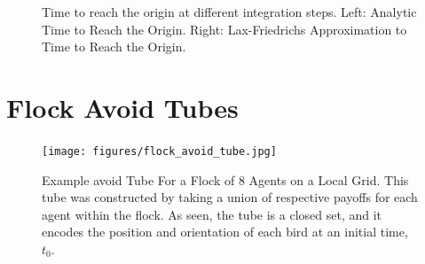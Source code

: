 \begin{figure}[tb!]
\begin{minipage}[b]{.45\textwidth}
	\end{minipage}
	\caption{\footnotesize Time to reach the origin at different integration steps. Left: Analytic Time to Reach the Origin. Right: Lax-Friedrichs Approximation to Time to Reach the Origin.}
	\label{fig:dubins_tube_basic}
\end{figure}

\section{Flock Avoid Tubes}


\begin{figure}[tb!]
	\centering
		\texttt{[image: figures/flock\_avoid\_tube.jpg]}
	\caption{Example avoid Tube For a Flock of 8 Agents on a Local Grid. This tube was constructed by taking a union of respective payoffs for each agent within the flock. As seen, the tube is a closed set, and it encodes the position and orientation of each bird at an initial time, $t_0$. }
\end{figure}
